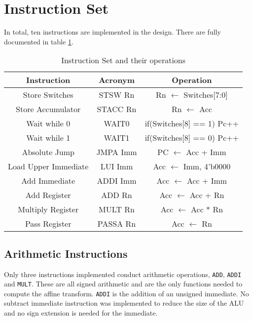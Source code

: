 

\section{Instruction Set}

In total, ten instructions are implemented in the design.
There are fully documented in table \ref{tab:isa}. 


\begin{table}
\caption{Instruction Set and their operations}
\label{tab:isa}
\begin{tabular}{ccc} \hline 
Instruction & Acronym & Operation \\ \hline
Store Switches & STSW Rn & Rn $\leftarrow$ Switches[7:0] \\
Store Accumulator & STACC Rn & Rn $\leftarrow$ Acc \\
Wait while 0 & WAIT0 & if(Switches[8] == 1) Pc++ \\
Wait while 1 & WAIT1 & if(Switches[8] == 0) Pc++ \\
Absolute Jump & JMPA Imm & PC $\leftarrow$ Acc + Imm \\
Load Upper Immediate & LUI Imm & Acc $\leftarrow$ {Imm, 4'b0000} \\
Add Immediate & ADDI Imm & Acc $\leftarrow$ Acc + Imm \\
Add Register & ADD Rn & Acc $\leftarrow$ Acc + Rn \\
Multiply Register & MULT Rn & Acc $\leftarrow$ Acc * Rn \\
Pass Register & PASSA Rn & Acc $\leftarrow$ Rn \\ \hline
\end{tabular}
\end{table}


\subsection{Arithmetic Instructions}

Only three instructions implemented conduct arithmetic operations, \texttt{ADD}, \texttt{ADDI} and \texttt{MULT}. 
These are all signed arithmetic and are the only functions needed to compute the affine transform. 
\texttt{ADDI} is the addition of an unsigned immediate. 
No subtract immediate instruction was implemented to reduce the size of the ALU and no sign extension is needed for the immediate. 

